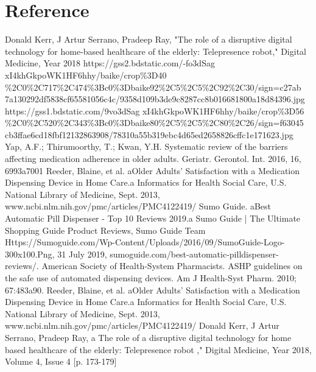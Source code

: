 \documentclass[12pt]{article}
\newcommand{\gadd}[1]{{\color{gray} #1}}
\begin{document}
\gadd{
\section{Reference}
\begin{thebibliography}{99}
\bibitem{1} Donald Kerr, J Artur Serrano, Pradeep Ray, "The role of a disruptive digital technology for home‑based healthcare of the elderly: Telepresence robot," Digital Medicine, Year 2018
\bibitem{2} https://gss2.bdstatic.com/-fo3dSag xI4khGkpoWK1HF6hhy/baike/crop\%3D40
\%2C0\%2C717\%2C474\%3Bc0\%3Dbaike92\%2C5\%2C5\%2C92\%2C30/sign=c27ab
7a130292df5838cf65581056c4c/9358d109b3de9c8287cc8b016681800a18d84396.jpg
\bibitem{3}https://gss1.bdstatic.com/9vo3dSag xI4khGkpoWK1HF6hhy/baike/crop\%3D56
\%2C0\%2C520\%2C343\%3Bc0\%3Dbaike80\%2C5\%2C5\%2C80\%2C26/sign=f63045
cb3ffae6cd18fbf12132863908/78310a55b319ebc4d65ed2658826cffc1e171623.jpg
\bibitem{4}Yap, A.F.; Thirumoorthy, T.; Kwan, Y.H. Systematic review of the barriers
affecting medication adherence in older adults. Geriatr. Gerontol. Int. 2016, 16,
6993a7001
\bibitem{5}Reeder, Blaine, et al. aOlder Adults’ Satisfaction with a Medication Dispensing Device in Home Care.a Informatics for Health Social Care, U.S. National Library of Medicine, Sept. 2013,
www.ncbi.nlm.nih.gov/pmc/articles/PMC4122419/
\bibitem{6}Sumo Guide. aBest Automatic Pill Dispenser - Top 10 Reviews 2019.a
Sumo Guide | The Ultimate Shopping Guide Product Reviews, Sumo
Guide Team Https://Sumoguide.com/Wp-Content/Uploads/2016/09/SumoGuide-Logo-300x100.Png, 31 July 2019, sumoguide.com/best-automatic-pilldispenser-reviews/.
\bibitem{7}American Society of Health-System Pharmacists. ASHP guidelines on the safe
use of automated dispensing devices. Am J Health-Syst Pharm. 2010; 67:483a90.
\bibitem{8}Reeder, Blaine, et al. aOlder Adults’ Satisfaction with a Medication Dispensing Device in Home Care.a Informatics for Health
Social Care, U.S. National Library of Medicine, Sept. 2013,
www.ncbi.nlm.nih.gov/pmc/articles/PMC4122419/
\bibitem{9}Donald Kerr, J Artur Serrano, Pradeep Ray, a The role of a disruptive digital technology for home based healthcare of the elderly: Telepresence robot ," Digital Medicine, Year 2018, Volume 4, Issue 4 [p. 173-179]

\end{thebibliography}}
\newpage
\end{document}
